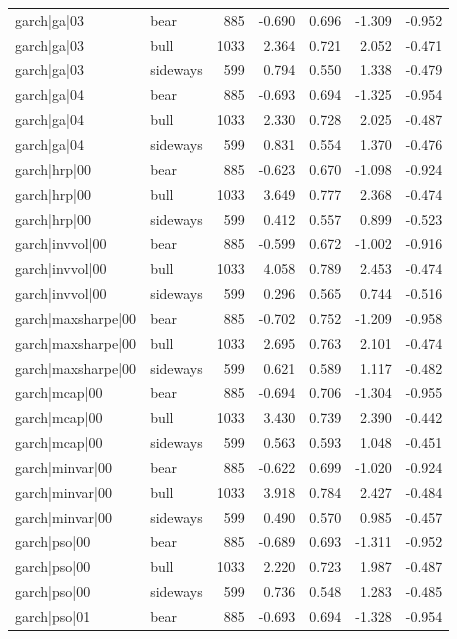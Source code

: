 \begin{table}
\begin{tabular}{llrrrrr}
garch|ga|03 & bear & 885 & -0.690 & 0.696 & -1.309 & -0.952 \\
garch|ga|03 & bull & 1033 & 2.364 & 0.721 & 2.052 & -0.471 \\
garch|ga|03 & sideways & 599 & 0.794 & 0.550 & 1.338 & -0.479 \\
garch|ga|04 & bear & 885 & -0.693 & 0.694 & -1.325 & -0.954 \\
garch|ga|04 & bull & 1033 & 2.330 & 0.728 & 2.025 & -0.487 \\
garch|ga|04 & sideways & 599 & 0.831 & 0.554 & 1.370 & -0.476 \\
garch|hrp|00 & bear & 885 & -0.623 & 0.670 & -1.098 & -0.924 \\
garch|hrp|00 & bull & 1033 & 3.649 & 0.777 & 2.368 & -0.474 \\
garch|hrp|00 & sideways & 599 & 0.412 & 0.557 & 0.899 & -0.523 \\
garch|invvol|00 & bear & 885 & -0.599 & 0.672 & -1.002 & -0.916 \\
garch|invvol|00 & bull & 1033 & 4.058 & 0.789 & 2.453 & -0.474 \\
garch|invvol|00 & sideways & 599 & 0.296 & 0.565 & 0.744 & -0.516 \\
garch|maxsharpe|00 & bear & 885 & -0.702 & 0.752 & -1.209 & -0.958 \\
garch|maxsharpe|00 & bull & 1033 & 2.695 & 0.763 & 2.101 & -0.474 \\
garch|maxsharpe|00 & sideways & 599 & 0.621 & 0.589 & 1.117 & -0.482 \\
garch|mcap|00 & bear & 885 & -0.694 & 0.706 & -1.304 & -0.955 \\
garch|mcap|00 & bull & 1033 & 3.430 & 0.739 & 2.390 & -0.442 \\
garch|mcap|00 & sideways & 599 & 0.563 & 0.593 & 1.048 & -0.451 \\
garch|minvar|00 & bear & 885 & -0.622 & 0.699 & -1.020 & -0.924 \\
garch|minvar|00 & bull & 1033 & 3.918 & 0.784 & 2.427 & -0.484 \\
garch|minvar|00 & sideways & 599 & 0.490 & 0.570 & 0.985 & -0.457 \\
garch|pso|00 & bear & 885 & -0.689 & 0.693 & -1.311 & -0.952 \\
garch|pso|00 & bull & 1033 & 2.220 & 0.723 & 1.987 & -0.487 \\
garch|pso|00 & sideways & 599 & 0.736 & 0.548 & 1.283 & -0.485 \\
garch|pso|01 & bear & 885 & -0.693 & 0.694 & -1.328 & -0.954 \\

\end{tabular}
\end{table}
